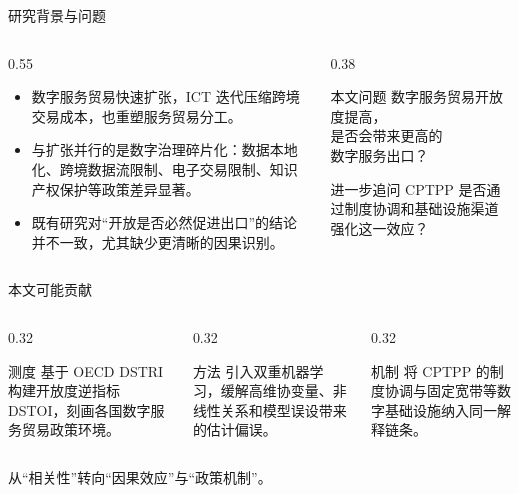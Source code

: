\documentclass[aspectratio=169,10pt]{ctexbeamer}
\begin{document}
\begin{frame}{研究背景与问题}
  \begin{columns}[T,totalwidth=\textwidth]
    \begin{column}{0.55\textwidth}
      \begin{itemize}
        \item 数字服务贸易快速扩张，ICT 迭代压缩跨境交易成本，也重塑服务贸易分工。
        \item 与扩张并行的是数字治理碎片化：数据本地化、跨境数据流限制、电子交易限制、知识产权保护等政策差异显著。
        \item 既有研究对“开放是否必然促进出口”的结论并不一致，尤其缺少更清晰的因果识别。
      \end{itemize}
    \end{column}
    \begin{column}{0.38\textwidth}
      \begin{block}{本文问题}
        \centering
        \large
        数字服务贸易开放度提高，\\
        是否会带来更高的\\
        数字服务出口？
      \end{block}
      \vspace{0.4em}
      \begin{block}{进一步追问}
        CPTPP 是否通过制度协调和基础设施渠道强化这一效应？
      \end{block}
    \end{column}
  \end{columns}
\end{frame}

\begin{frame}{本文可能贡献}
  \begin{columns}[T,totalwidth=\textwidth]
    \begin{column}{0.32\textwidth}
      \begin{block}{测度}
        基于 OECD DSTRI 构建开放度逆指标 DSTOI，刻画各国数字服务贸易政策环境。
      \end{block}
    \end{column}
    \begin{column}{0.32\textwidth}
      \begin{block}{方法}
        引入双重机器学习，缓解高维协变量、非线性关系和模型误设带来的估计偏误。
      \end{block}
    \end{column}
    \begin{column}{0.32\textwidth}
      \begin{block}{机制}
        将 CPTPP 的制度协调与固定宽带等数字基础设施纳入同一解释链条。
      \end{block}
    \end{column}
  \end{columns}
  \vspace{0.8em}
  \begin{center}
    \Large \textcolor{XJTUBlue}{从“相关性”转向“因果效应”与“政策机制”。}
  \end{center}
\end{frame}
\end{document}
